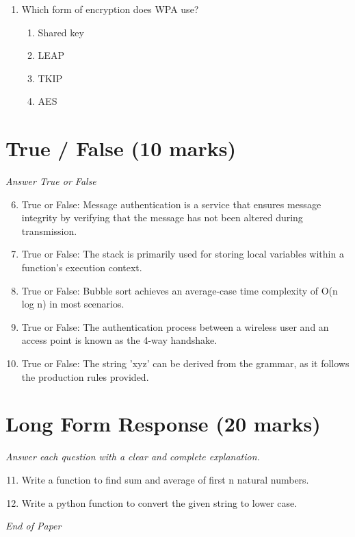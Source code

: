 \documentclass[12pt]{article}
\begin{document}
\begin{enumerate}[label=\arabic*.]
\begin{enumerate}[label=(\alph*)]
    \item Physical layer
    \item Data-link Layer
    \item Session layer
    \item Presentation layer
\end{enumerate}
\item Which form of encryption does WPA use?
\begin{enumerate}[label=(\alph*)]
    \item Shared key
    \item LEAP
    \item TKIP
    \item AES
\end{enumerate}
\end{enumerate}

\section*{True / False (10 marks)}
\textit{Answer True or False}
\begin{enumerate}[label=\arabic*.]
\setcounter{enumi}{5}
\item True or False: Message authentication is a service that ensures message integrity by verifying that the message has not been altered during transmission.
\item True or False: The stack is primarily used for storing local variables within a function's execution context.
\item True or False: Bubble sort achieves an average-case time complexity of O(n log n) in most scenarios.
\item True or False: The authentication process between a wireless user and an access point is known as the 4-way handshake.
\item True or False: The string 'xyz' can be derived from the grammar, as it follows the production rules provided.
\end{enumerate}

\section*{Long Form Response (20 marks)}
\textit{Answer each question with a clear and complete explanation.}
\begin{enumerate}[label=\arabic*.]
\setcounter{enumi}{10}
\item Write a function to find sum and average of first n natural numbers.
\item Write a python function to convert the given string to lower case.
\end{enumerate}

\vfill
\noindent\textit{End of Paper}
\end{document}
